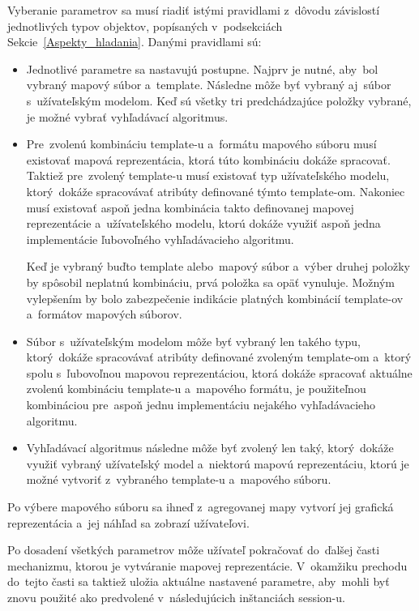 Vyberanie parametrov sa musí riadiť istými pravidlami z~dôvodu závislostí jednotlivých typov objektov, popísaných v~podsekciách Sekcie~\ref{Aspekty_hladania}. Danými pravidlami sú:
\begin{itemize}
    \item Jednotlivé parametre sa nastavujú postupne. Najprv je nutné, aby~bol vybraný mapový súbor a~template. Následne môže byť vybraný aj~súbor s~užívateľským modelom. Keď sú všetky tri predchádzajúce položky vybrané, je možné vybrať vyhľadávací algoritmus. 
    \item Pre~zvolenú kombináciu template-u a~formátu mapového súboru musí existovať mapová reprezentácia, ktorá túto kombináciu dokáže spracovať. Taktiež pre~zvolený template-u musí existovať typ užívateľského modelu, ktorý~dokáže spracovávať atribúty definované týmto template-om. Nakoniec musí existovať aspoň jedna kombinácia takto definovanej mapovej reprezentácie a~užívateľského modelu, ktorú dokáže využiť aspoň jedna implementácie ľubovoľného vyhľadávacieho algoritmu.   
    
    Keď je vybraný buďto template alebo~mapový súbor a~výber druhej položky by spôsobil neplatnú kombináciu, prvá položka sa opäť vynuluje. Možným vylepšením by bolo zabezpečenie indikácie platných kombinácií template-ov a~formátov mapových súborov.
    \item Súbor s~užívateľským modelom môže byť vybraný len takého typu, ktorý~dokáže spracovávať atribúty definované zvoleným template-om a~ktorý spolu s~ľubovoľnou mapovou reprezentáciou, ktorá dokáže spracovať aktuálne zvolenú kombináciu template-u a~mapového formátu, je použiteľnou kombináciou pre~aspoň jednu implementáciu nejakého vyhľadávacieho algoritmu. 
    \item Vyhľadávací algoritmus následne môže byť zvolený len taký, ktorý~dokáže využiť vybraný užívateľský model a~niektorú mapovú reprezentáciu, ktorú je možné vytvoriť z~vybraného template-u a~mapového súboru.
\end{itemize}    

Po výbere mapového súboru sa ihneď z~agregovanej mapy vytvorí jej grafická reprezentácia a~jej náhľad sa zobrazí užívateľovi.

Po dosadení všetkých parametrov môže užívateľ pokračovať do~ďalšej časti mechanizmu, ktorou je vytváranie mapovej reprezentácie. V~okamžiku prechodu do~tejto časti sa taktiež uložia aktuálne nastavené parametre, aby~mohli byť znovu použité ako predvolené v~následujúcich inštanciách session-u. 

